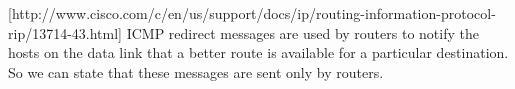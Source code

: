 [http://www.cisco.com/c/en/us/support/docs/ip/routing-information-protocol-rip/13714-43.html]
ICMP redirect messages are used by routers to notify the hosts on the data link that a better route is available for a particular destination. So we can state that these messages are sent only by routers.